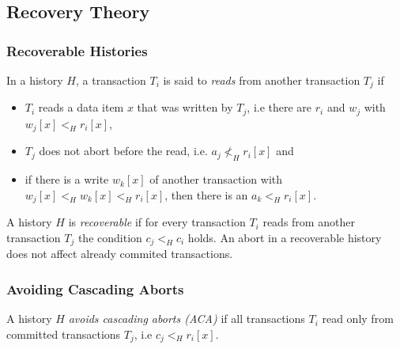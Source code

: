 

\subsection{Recovery Theory}




\subsubsection{Recoverable Histories}

In a history $H$, a transaction $T_i$ is said to \emph{reads} from another transaction $T_j$ if
\begin{itemize}
\item $T_i$ reads a data item $x$ that was written by $T_j$, i.e there are $r_i$ and $w_j$ with $w_j[x] <_H r_i[x]$,
\item $T_j$ does not abort before the read, i.e. $a_j \not<_H r_i[x]$ and
\item if there is a write $w_k[x]$ of another transaction with $w_j[x] <_H w_k[x] <_H r_i[x]$, then there is an $a_k <_H r_i[x]$.
\end{itemize}

A history $H$ is \emph{recoverable} if for every transaction $T_i$ reads from another transaction $T_j$ the condition $c_j <_H c_i$ holds. An abort in a recoverable history does not affect already commited transactions.




\subsubsection{Avoiding Cascading Aborts}

A history $H$ \emph{avoids cascading aborts (ACA)} if all transactions $T_i$ read only from committed transactions $T_j$, i.e $c_j <_H r_i[x]$.


